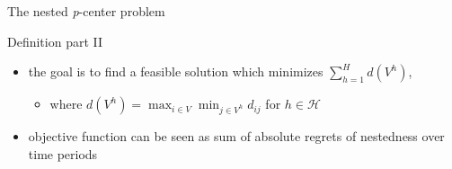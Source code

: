 \documentclass[utf8,aspectratio=1610,ngerman,english]{beamer}
\begin{document}
\begin{frame}{The nested \textit{p}-center problem}
\begin{minipage}{0.48\textwidth}
\begin{block}{Definition part II}
\begin{itemize}
                      \begin{itemize}
                          \item with $\left\lvert V^h \right\rvert = p^h$ for $h \in \mathcal H$,
                          \item for which $V^h \subseteq V^{h+1}$ for $h = 1, \dots, H-1$ holds \pause
                      \end{itemize}
                \item the goal is to find a feasible solution which minimizes $\sum_{h = 1}^{H} d(V^h)$,
                      \begin{itemize}
                          \item where $d(V^h) = \max_{i \in V}\min_{j \in V^h} d_{ij}$ for $h \in \mathcal H$
                      \end{itemize}
                \item objective function can be seen as sum of absolute regrets of nestedness over time periods
            \end{itemize}
        \end{block}
    \end{minipage}
\end{frame}

\end{document}
